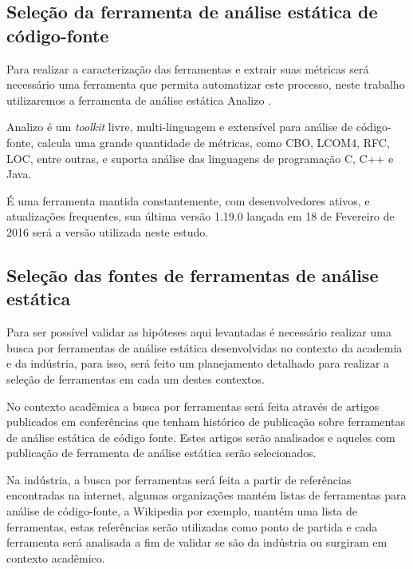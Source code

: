 \documentclass[qual, classic, a4paper]{ufbathesis}
\begin{document}
\subsection{Seleção da ferramenta de análise estática de código-fonte}

Para realizar a caracterização das ferramentas e extrair suas métricas
será necessário uma ferramenta que permita automatizar este
processo, neste trabalho utilizaremos a ferramenta de análise estática Analizo
\cite{Terceiro2010}.

Analizo é um {\it toolkit} livre, multi-linguagem e extensível para análise de
código-fonte, calcula uma grande quantidade de métricas, como CBO, LCOM4, RFC,
LOC, entre outras, e suporta análise das linguagens de programação C, C++ e
Java.

É uma ferramenta mantida constantemente, com desenvolvedores ativos, e
atualizações frequentes, sua última versão 1.19.0 lançada em 18 de Fevereiro
de 2016 será a versão utilizada neste estudo.


\subsection{Seleção das fontes de ferramentas de análise estática}\label{levantamento}

Para ser possível validar as hipóteses aqui levantadas é necessário realizar
uma busca por ferramentas de análise estática desenvolvidas no contexto da
academia e da indústria, para isso, será feito um planejamento detalhado para
realizar a seleção de ferramentas em cada um destes contextos.

No contexto acadêmica a busca por ferramentas será feita
através de artigos publicados em conferências que tenham histórico de
publicação sobre ferramentas de análise estática de código fonte. Estes
artigos serão analisados e aqueles com publicação de ferramenta de análise
estática serão selecionados.

Na indústria, a busca por ferramentas será feita a partir
de referências encontradas na internet, algumas organizações mantém listas de
ferramentas para análise de código-fonte, a Wikipedia por exemplo, mantém uma lista
de ferramentas, estas referências serão utilizadas como ponto de partida e
cada ferramenta será analisada a fim de validar se são da indústria ou
surgiram em contexto acadêmico.
\end{document}
